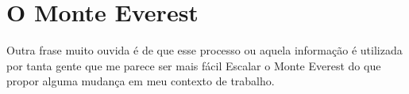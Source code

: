 \section{O Monte Everest}

Outra frase muito ouvida é de que esse processo ou aquela informação é utilizada por tanta gente que me parece ser mais fácil Escalar o Monte Everest do que propor alguma mudança em meu contexto de trabalho.
